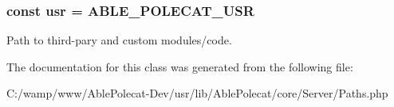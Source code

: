 \subsubsection[{usr}]{\setlength{\rightskip}{0pt plus 5cm}const usr = A\+B\+L\+E\+\_\+\+P\+O\+L\+E\+C\+A\+T\+\_\+\+U\+S\+R}\label{class_able_polecat___server___paths_acc8c23568756f209aed591b949cba229}
Path to third-\/pary and custom modules/code. 

The documentation for this class was generated from the following file\+:\begin{DoxyCompactItemize}
\item 
C\+:/wamp/www/\+Able\+Polecat-\/\+Dev/usr/lib/\+Able\+Polecat/core/\+Server/Paths.\+php\end{DoxyCompactItemize}
